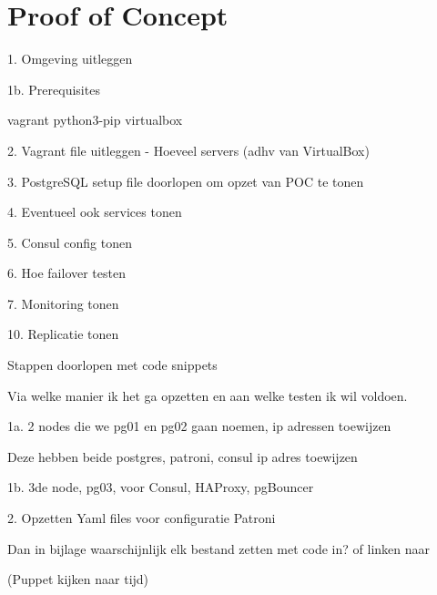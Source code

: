 
\chapter{Proof of Concept}

\label{ch:Proof of Concept}

1. Omgeving uitleggen

1b. Prerequisites

vagrant
python3-pip
virtualbox


2. Vagrant file uitleggen
- Hoeveel servers (adhv van VirtualBox)

3. PostgreSQL setup file doorlopen om opzet van POC te tonen

4. Eventueel ook services tonen

5. Consul config tonen

6. Hoe failover testen

7. Monitoring tonen

10. Replicatie tonen


Stappen doorlopen met code snippets

Via welke manier ik het ga opzetten en aan welke testen ik wil voldoen.

1a. 2 nodes die we pg01 en pg02 gaan noemen, ip adressen toewijzen

Deze hebben beide postgres, patroni, consul
ip adres toewijzen

1b. 3de node, pg03, voor Consul, HAProxy, pgBouncer


2. Opzetten Yaml files voor configuratie Patroni





Dan in bijlage waarschijnlijk elk bestand zetten met code in?
of linken naar 




(Puppet kijken naar tijd)

